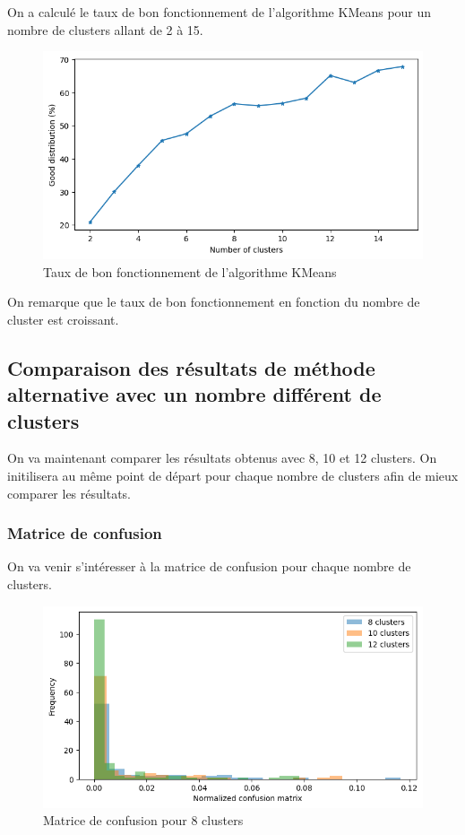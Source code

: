 \documentclass[french,a4paper,18pt]{article}
\begin{document}
On a calculé le taux de bon fonctionnement de l'algorithme KMeans pour un nombre de clusters allant de 2 à 15.

\begin{figure}[h!]
    \centering
    \includegraphics[scale=0.4]{../images/mnist_kmeans_good_distribution.png}
    \caption{Taux de bon fonctionnement de l'algorithme KMeans}\label{fig:mnist_kmeans_score}
\end{figure}
On remarque que le taux de bon fonctionnement en fonction du nombre de cluster est croissant.

\subsection{Comparaison des résultats de méthode alternative avec un nombre différent de clusters}

On va maintenant comparer les résultats obtenus avec 8, 10 et 12 clusters.
On initilisera au même point de départ pour chaque nombre de clusters afin de mieux comparer les résultats.

\subsubsection{Matrice de confusion}
On va venir s'intéresser à la matrice de confusion pour chaque nombre de clusters. 

\begin{figure}[h!]
    \centering
    \includegraphics[scale=0.5]{../images/mnist_kmeans_normalized_confusion_matrix_comparaison.png}
    \caption{Matrice de confusion pour 8 clusters}\label{fig:mnist_kmeans_confusion_comparaison}
\end{figure}
\end{document}

